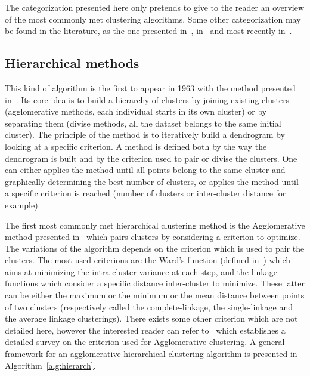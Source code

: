     The categorization presented here only pretends to give to the reader an overview of the most commonly met clustering algorithms. Some other categorization may be found in the literature, as the one presented in~\cite{jain1999data}, in~\cite{xu2005survey} and most recently in~\cite{fahad2014survey}.

    \subsection{Hierarchical methods}

    This kind of algorithm is the first to appear in 1963 with the method presented in~\cite{ward1963hierarchical}. Its core idea is to build a hierarchy of clusters by joining existing clusters (agglomerative methods, each individual starts in its own cluster) or by separating them (divise methods, all the dataset belongs to the same initial cluster). The principle of the method is to iteratively build a dendrogram by looking at a specific criterion. A method is defined both by the way the dendrogram is built and by the criterion used to pair or divise the clusters. One can either applies the method until all points belong to the same cluster and graphically determining the best number of clusters, or applies the method until a specific criterion is reached (number of clusters or inter-cluster distance for example).

    The first most commonly met hierarchical clustering method is the Agglomerative method presented in~\cite{ward1963hierarchical} which pairs clusters by considering a criterion to optimize. The variations of the algorithm depends on the criterion which is used to pair the clusters. The most used criterions are the Ward's function (defined in~\cite{ward1963hierarchical}) which aims at minimizing the intra-cluster variance at each step, and the linkage functions which consider a specific distance inter-cluster to minimize. These latter can be either the maximum or the minimum or the mean distance between points of two clusters (respectively called the complete-linkage, the single-linkage and the average linkage clusterings). There exists some other criterion which are not detailed here, however the interested reader can refer to~\cite{murtagh1983survey} which establishes a detailed survey on the criterion used for Agglomerative clustering. A general framework for an agglomerative hierarchical clustering algorithm is presented in Algorithm~\ref{alg:hierarch}.\\

